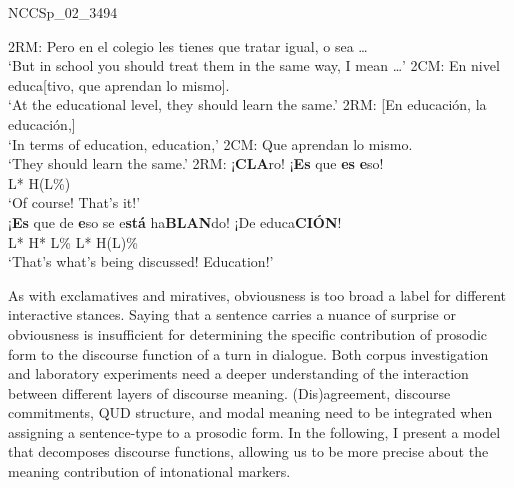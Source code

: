 \begin{exe}
\ex\label{ex:claroesquedeesoTORREIRAGRICErepeat} NCCSp\_02\_3494
	\begin{xlist}
		\ex
		2RM: Pero en el colegio les tienes que tratar igual, o sea \ldots\\
		\hspace*{2em} `But in school you should treat them in the same way, I mean \ldots'
		\ex
		2CM: En nivel educa[tivo, que aprendan lo mismo].\\
		\hspace*{2em} `At the educational level, they should learn the same.'
		\ex
		2RM: \hspace{7em}[En educación, la educación,]\\
		\hspace*{9em} `In terms of education, education,'
		\ex
		2CM: Que aprendan lo mismo.\\
		\hspace*{2em} `They should learn the same.'
		\ex
		2RM: ¡\textbf{CLA}ro! \hspace{2em} ¡\textbf{Es} que \textbf{es} \textbf{e}so! \\
		\hspace*{3em} L* H(L\%) \\
		\hspace*{2em} `Of course! \hspace{1.5em} That's it!' \\
		\hspace*{2em} ¡\textbf{Es} que de \textbf{e}so se e\textbf{stá} ha\textbf{BLAN}do! ¡De educa\textbf{CIÓN}! \\
		\hspace*{2em} L* \hspace*{9.6em} H* L\% \hspace{4em} L* H(L)\% \\
		\hspace*{2em} `That's what's being discussed! \hspace{2.5em} Education!'
	\end{xlist}
\end{exe}

As with exclamatives and miratives, obviousness is too broad a label for different interactive stances. Saying that a sentence carries a nuance of surprise or obviousness is insufficient for determining the specific contribution of prosodic form to the discourse function of a turn in dialogue. Both corpus investigation and laboratory experiments need a deeper understanding of the interaction between different layers of discourse meaning. (Dis)agreement, discourse commitments, \ac{QUD} structure, and modal meaning need to be integrated when assigning a sentence-type to a prosodic form. In the following, I present a model that decomposes discourse functions, allowing us to be more precise about the meaning contribution of intonational markers.

